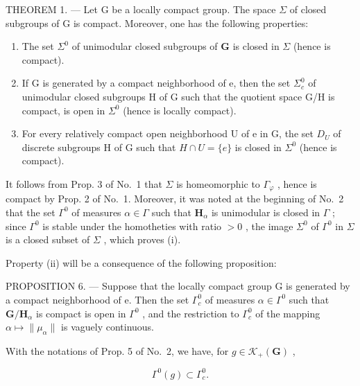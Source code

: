THEOREM 1. --- Let G be a locally compact group. The space \(\Sigma\) of closed subgroups of G is compact. Moreover, one has the following properties:

\begin{enumerate}
\def\labelenumi{(\roman{enumi})}
\item
  The set \(\Sigma^0\) of unimodular closed subgroups of \(\mathbf{G}\) is closed in \(\Sigma\) (hence is compact).
\item
  If G is generated by a compact neighborhood of e, then the set \(\Sigma_{c}^{0}\) of unimodular closed subgroups H of G such that the quotient space G/H is compact, is open in \(\Sigma^{0}\) (hence is locally compact).
\item
  For every relatively compact open neighborhood U of e in G, the set \(D_{U}\) of discrete subgroups H of G such that \(H \cap U = \{e\}\) is closed in \(\Sigma^{0}\) (hence is compact).
\end{enumerate}

It follows from Prop. 3 of No.~1 that \(\Sigma\) is homeomorphic to \(\Gamma_{\varphi}\) , hence is compact by Prop. 2 of No.~1. Moreover, it was noted at the beginning of No.~2 that the set \(\Gamma^0\) of measures \(\alpha \in \Gamma\) such that \(\mathbf{H}_{\alpha}\) is unimodular is closed in \(\Gamma\) ; since \(\Gamma^0\) is stable under the homotheties with ratio \(>0\) , the image \(\Sigma^0\) of \(\Gamma^0\) in \(\Sigma\) is a closed subset of \(\Sigma\) , which proves (i).

Property (ii) will be a consequence of the following proposition:

PROPOSITION 6. --- Suppose that the locally compact group G is generated by a compact neighborhood of e. Then the set \(\Gamma_{c}^{0}\) of measures \(\alpha\in\Gamma^{0}\) such that \(\mathbf{G} / \mathbf{H}_{\alpha}\) is compact is open in \(\Gamma^0\) , and the restriction to \(\Gamma_c^0\) of the mapping \(\alpha \mapsto \| \mu_{\alpha}\|\) is vaguely continuous.

With the notations of Prop. 5 of No.~2, we have, for \(g \in \mathcal{K}_{+}(\mathbf{G})\) ,

\[
\Gamma^ {0} (g) \subset \Gamma_ {c} ^ {0}.\tag{6}
\]

